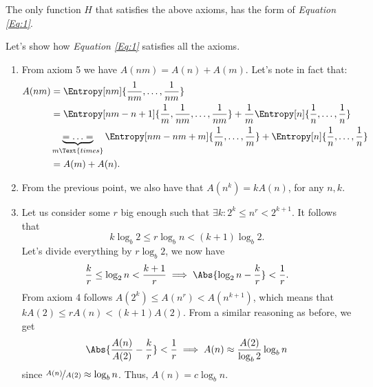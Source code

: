 \documentclass{subfiles}
\begin{document}
    \begin{theorem*}
        The only function \(H\) that satisfies the above axioms,
        has the form of \emph{Equation \eqref{Eq:1}}.
    \end{theorem*}
    \begin{proof*}
        Let's show how \emph{Equation \eqref{Eq:1}} satisfies all the axioms.
        \begin{enumerate}
            \item From axiom 5 we have \(A(nm) = A(n) + A(m)\).
                Let's note in fact that: 
                \[\begin{aligned}
                    A(nm) & = \Entropy[nm]{\frac{1}{nm}, \ldots, \frac{1}{nm}} \\ 
                        & = \Entropy[nm - n + 1]{
                            \frac{1}{m}, \frac{1}{nm}, \ldots, \frac{1}{nm} 
                        } + \frac{1}{m} \Entropy[n]{
                            \frac{1}{n}, \ldots, \frac{1}{n}
                        } \\
                        & \underbrace{ = \ldots = }_{m \Text{times}} \Entropy[nm -nm + m]{
                            \frac{1}{m}, \ldots, \frac{1}{m}
                        } + \Entropy[n]{ \frac{1}{n}, \ldots, \frac{1}{n}} \\ 
                    & = A(m) + A(n).
                \end{aligned}\]
            \item From the previous point, 
                we also have that \(A(n^{k}) = k A(n)\), for any \(n, k\).

            \item Let us consider some \(r\) big enough such that 
                \(\exists k : 2^{k} \le n^{r} < 2^{k + 1}\).
                It follows that 
                \[
                    k \log_{b} 2 \le r \log_{b} n < (k + 1) \log_{b} 2.
                \]
                Let's divide everything by \(r \log_{b} 2\), we now have 
                \[
                    \frac{k}{r} \le \log_{2} n < \frac{k + 1}{r} 
                        \implies \Abs{\log_{2} n - \frac{k}{r}} < \frac{1}{r}.
                \]
                From axiom 4 follows \(A(2^{k}) \le A(n^{r}) < A(n^{k + 1})\),
                which means that \(k A(2) \le r A(n) < (k + 1)A(2)\).
                From a similar reasoning as before, we get 
                \[
                    \Abs{\frac{A(n)}{A(2)} - \frac{k}{r}} < \frac{1}{r}
                        \implies A(n) \approx \frac{A(2)}{\log_{b} 2} \log_{b} n
                \]
                since \(\nicefrac{A(n)}{A(2)} \approx \log_{b} n\).
                Thus, \(A(n) = c \log_{b} n\).


\end{enumerate}
\end{proof*}
\end{document}
